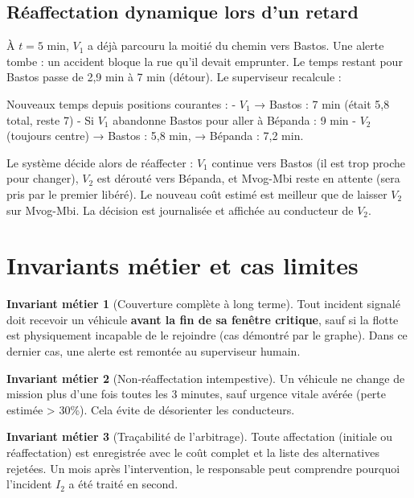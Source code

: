 \documentclass[12pt,a4paper]{article}
\theoremstyle{definition}
\newtheorem{invariant}{Invariant métier}[section]
\theoremstyle{remark}
\begin{document}
\subsection{Réaffectation dynamique lors d’un retard}

À $t=5$ min, $V_1$ a déjà parcouru la moitié du chemin vers Bastos.
Une alerte tombe : un accident bloque la rue qu’il devait emprunter.
Le temps restant pour Bastos passe de 2,9 min à 7 min (détour).
Le superviseur recalcule :

Nouveaux temps depuis positions courantes :
- $V_1$ → Bastos : 7 min (était 5,8 total, reste 7)
- Si $V_1$ abandonne Bastos pour aller à Bépanda : 9 min
- $V_2$ (toujours centre) → Bastos : 5,8 min, → Bépanda : 7,2 min.

Le système décide alors de réaffecter : $V_1$ continue vers Bastos
(il est trop proche pour changer), $V_2$ est dérouté vers Bépanda,
et Mvog-Mbi reste en attente (sera pris par le premier libéré).
Le nouveau coût estimé est meilleur que de laisser $V_2$ sur Mvog-Mbi.
La décision est journalisée et affichée au conducteur de $V_2$.

\newpage

\section{Invariants métier et cas limites}

\begin{invariant}[Couverture complète à long terme]
Tout incident signalé doit recevoir un véhicule \textbf{avant la fin
de sa fenêtre critique}, sauf si la flotte est physiquement incapable
de le rejoindre (cas démontré par le graphe). Dans ce dernier cas,
une alerte est remontée au superviseur humain.
\end{invariant}

\begin{invariant}[Non‑réaffectation intempestive]
Un véhicule ne change de mission plus d’une fois toutes les 3 minutes,
sauf urgence vitale avérée (perte estimée > 30\%). Cela évite de
désorienter les conducteurs.
\end{invariant}

\begin{invariant}[Traçabilité de l’arbitrage]
Toute affectation (initiale ou réaffectation) est enregistrée avec
le coût complet et la liste des alternatives rejetées. Un mois après
l’intervention, le responsable peut comprendre pourquoi l’incident
$I_2$ a été traité en second.
\end{invariant}
\end{document}
